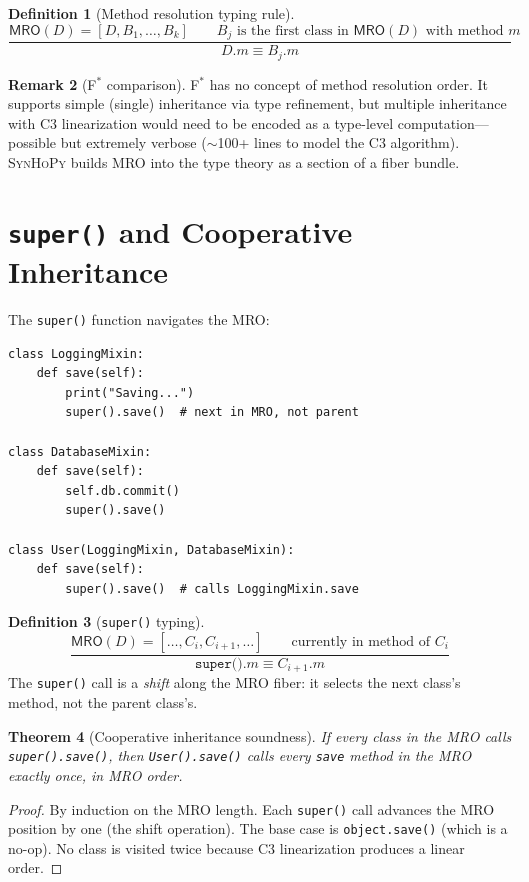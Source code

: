 \documentclass[11pt,a4paper]{report}
\theoremstyle{definition}
\newtheorem{definition}{Definition}[chapter]
\newtheorem{remark}[definition]{Remark}
\theoremstyle{plain}
\newtheorem{theorem}[definition]{Theorem}
\newcommand{\MRO}{\mathsf{MRO}}
\newcommand{\fstar}{F$^{*}$}
\newcommand{\synhopy}{\textsc{SynHoPy}}
\begin{document}
\begin{definition}[Method resolution typing rule]
\[
  \frac{
    \MRO(D) = [D, B_1, \ldots, B_k] \qquad
    B_j \text{ is the first class in } \MRO(D) \text{ with method } m
  }{
    D.m \equiv B_j.m
  }
\]
\end{definition}

\begin{remark}[\fstar{} comparison]
\fstar{} has no concept of method resolution order. It supports simple
(single) inheritance via type refinement, but multiple inheritance with C3
linearization would need to be encoded as a type-level computation---possible
but extremely verbose ($\sim$100+ lines to model the C3 algorithm). \synhopy{}
builds MRO into the type theory as a section of a fiber bundle.
\end{remark}

\section{\texttt{super()} and Cooperative Inheritance}

The \texttt{super()} function navigates the MRO:
\begin{lstlisting}[style=python]
class LoggingMixin:
    def save(self):
        print("Saving...")
        super().save()  # next in MRO, not parent

class DatabaseMixin:
    def save(self):
        self.db.commit()
        super().save()

class User(LoggingMixin, DatabaseMixin):
    def save(self):
        super().save()  # calls LoggingMixin.save
\end{lstlisting}

\begin{definition}[\texttt{super()} typing]
\[
  \frac{
    \MRO(D) = [\ldots, C_i, C_{i+1}, \ldots] \qquad
    \text{currently in method of } C_i
  }{
    \texttt{super()}.m \equiv C_{i+1}.m
  }
\]
The \texttt{super()} call is a \emph{shift} along the MRO fiber:
it selects the next class's method, not the parent class's.
\end{definition}

\begin{theorem}[Cooperative inheritance soundness]
If every class in the MRO calls \texttt{super().save()}, then
\texttt{User().save()} calls every \texttt{save} method in the MRO exactly once,
in MRO order.
\end{theorem}
\begin{proof}
By induction on the MRO length.  Each \texttt{super()} call advances the MRO
position by one (the shift operation).  The base case is \texttt{object.save()}
(which is a no-op).  No class is visited twice because C3 linearization
produces a linear order.
\end{proof}
\end{document}
